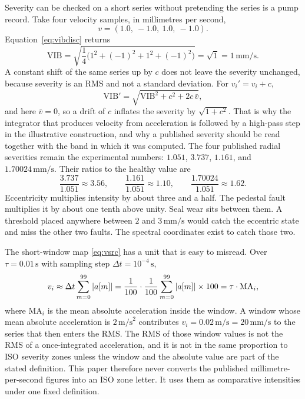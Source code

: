 Severity can be checked on a short series without pretending the series is a pump record.
Take four velocity samples, in millimetres per second,
\begin{equation}
v=(1.0,\ -1.0,\ 1.0,\ -1.0).
\label{eq:vtoy}
\end{equation}
Equation~\eqref{eq:vibdisc} returns
\begin{equation}
\mathrm{VIB}=\sqrt{\frac{1}{4}\bigl(1^{2}+(-1)^{2}+1^{2}+(-1)^{2}\bigr)}
=\sqrt{1}=1\,\mathrm{mm/s}.
\label{eq:vibtoy}
\end{equation}
A constant shift of the same series up by \(c\) does not leave the severity unchanged, because severity is an RMS and not a standard deviation.
For \(v_{i}'=v_{i}+c\),
\begin{equation}
\mathrm{VIB}'=\sqrt{\mathrm{VIB}^{2}+c^{2}+2c\,\bar{v}},
\label{eq:vibshift}
\end{equation}
and here \(\bar{v}=0\), so a drift of \(c\) inflates the severity by \(\sqrt{1+c^{2}}\).
That is why the integrator that produces velocity from acceleration is followed by a high-pass step in the illustrative construction, and why a published severity should be read together with the band in which it was computed.
The four published radial severities remain the experimental numbers: \(1.051\), \(3.737\), \(1.161\), and \(1.70024\,\mathrm{mm/s}\).
Their ratios to the healthy value are
\begin{equation}
\frac{3.737}{1.051}\approx 3.56,
\qquad
\frac{1.161}{1.051}\approx 1.10,
\qquad
\frac{1.70024}{1.051}\approx 1.62.
\label{eq:vibatios}
\end{equation}
Eccentricity multiplies intensity by about three and a half.
The pedestal fault multiplies it by about one tenth above unity.
Seal wear sits between them.
A threshold placed anywhere between \(2\) and \(3\,\mathrm{mm/s}\) would catch the eccentric state and miss the other two faults.
The spectral coordinates exist to catch those two.

The short-window map \eqref{eq:vsrc} has a unit that is easy to misread.
Over \(\tau=0.01\,\mathrm{s}\) with sampling step \(\Delta t=10^{-4}\,\mathrm{s}\),
\begin{equation}
v_{i}\approx \Delta t\sum_{m=0}^{99}\left\lvert a[m] \right\rvert
=\frac{1}{100}\cdot\frac{1}{100}\sum_{m=0}^{99}\left\lvert a[m] \right\rvert\times 100
=\tau\cdot\mathrm{MA}_{i},
\label{eq:ma}
\end{equation}
where \(\mathrm{MA}_{i}\) is the mean absolute acceleration inside the window.
A window whose mean absolute acceleration is \(2\,\mathrm{m/s}^{2}\) contributes \(v_{i}=0.02\,\mathrm{m/s}=20\,\mathrm{mm/s}\) to the series that then enters the RMS.
The RMS of those window values is not the RMS of a once-integrated acceleration, and it is not in the same proportion to ISO severity zones unless the window and the absolute value are part of the stated definition.
This paper therefore never converts the published millimetre-per-second figures into an ISO zone letter.
It uses them as comparative intensities under one fixed definition.


